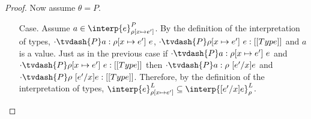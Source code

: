 \begin{proof}
  Now assume $\theta = P$.
  \begin{itemize}
  \item[Case.] Assume $a \in \interp{e}^P_{\rho[x \mapsto e']}$.  By the definition of the 
    interpretation of types, $\cdot \tvdash{P} a:\rho[x \mapsto e']\ e$,
    $\cdot \tvdash{P} \rho[x \mapsto e']\ e:[[Type]]$ and $a$ is a value.
    Just as in the previous case if $\cdot \tvdash{P} a:\rho[x \mapsto e']\ e$ and
    $\cdot \tvdash{P} \rho[x \mapsto e']\ e:[[Type]]$ then
    $\cdot \tvdash{P} a:\rho\ [e'/x]e$ and $\cdot \tvdash{P} \rho\ [e'/x]e:[[Type]]$.  Therefore, by 
    the definition of the interpretation of
    types, $\interp{e}^L_{\rho[x \mapsto e']} \subseteq \interp{[e'/x]e}^L_\rho$.
  \end{itemize}
\end{proof}

